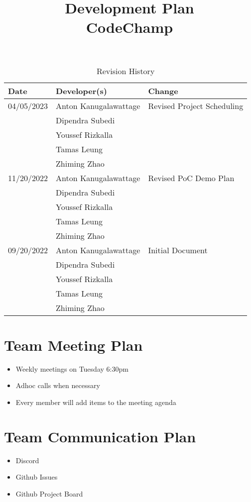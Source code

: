 \documentclass{article}
\title{Development Plan\\CodeChamp}
\author{\authname}
\date{}
\begin{document}
\begin{table}[hp]
\caption{Revision History} \label{TblRevisionHistory}
\begin{tabularx}{\textwidth}{llX}
\toprule
\textbf{Date} & \textbf{Developer(s)} & \textbf{Change}\\
\midrule
04/05/2023 & Anton Kanugalawattage & Revised Project Scheduling\\
  & Dipendra Subedi & \\
  & Youssef Rizkalla &\\
  & Tamas Leung & \\
  & Zhiming Zhao & \\
\midrule
11/20/2022 & Anton Kanugalawattage & Revised PoC Demo Plan\\
  & Dipendra Subedi & \\
  & Youssef Rizkalla &\\
  & Tamas Leung & \\
  & Zhiming Zhao & \\
\midrule
09/20/2022 & Anton Kanugalawattage & Initial Document\\
  & Dipendra Subedi & \\
  & Youssef Rizkalla &\\
  & Tamas Leung & \\
  & Zhiming Zhao & \\
\bottomrule
\end{tabularx}
\end{table}

\newpage

\maketitle


\section{Team Meeting Plan}
\begin{itemize}
\item Weekly meetings on Tuesday 6:30pm
\item Adhoc calls when necessary
\item Every member will add items to the meeting agenda
\end{itemize}

\section{Team Communication Plan}
\begin{itemize}
\item Discord
\item Github Issues
\item Github Project Board
\end{itemize}
\end{document}
